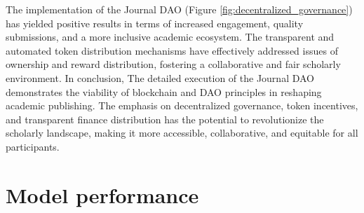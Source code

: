 \documentclass[lettersize,journal]{IEEEtran}
\begin{document}
The implementation of the Journal DAO (Figure \ref{fig:decentralized_governance}) has yielded positive results in terms of increased engagement, quality submissions, and a more inclusive academic ecosystem. The transparent and automated token distribution mechanisms have effectively addressed issues of ownership and reward distribution, fostering a collaborative and fair scholarly environment.
In conclusion, The detailed execution of the Journal DAO demonstrates the viability of blockchain and DAO principles in reshaping academic publishing. The emphasis on decentralized governance, token incentives, and transparent finance distribution has the potential to revolutionize the scholarly landscape, making it more accessible, collaborative, and equitable for all participants.

\section{Model performance \label{sec:performance}}
\end{document}
